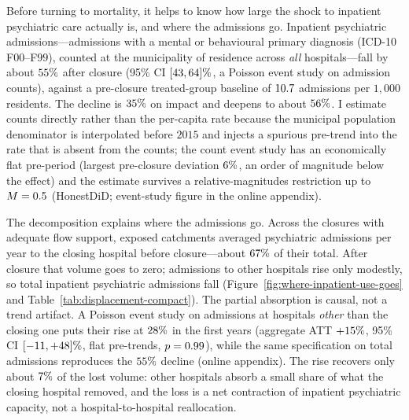 Before turning to mortality, it helps to know how large the shock to inpatient
psychiatric care actually is, and where the admissions go. Inpatient
psychiatric admissions---admissions with a mental or behavioural primary
diagnosis (ICD-10 F$00$--F$99$), counted at the municipality of residence
across \emph{all} hospitals---fall by about $55\%$ after closure
(95\% CI $[43, 64]\%$, a Poisson event study on admission
counts), against a pre-closure treated-group baseline of $10.7$
admissions per $1{,}000$ residents. The decline is $35\%$ on
impact and deepens to about $56\%$. I estimate counts directly
rather than the per-capita rate because the municipal population denominator is
interpolated before $2015$ and injects a spurious pre-trend into the rate that is
absent from the counts; the count event study has an economically flat pre-period
(largest pre-closure deviation $6\%$, an order of magnitude below
the effect) and the estimate survives a relative-magnitudes restriction up to
$M = 0.5$ (HonestDiD; event-study figure in the online appendix).

The decomposition explains where the admissions go.
Across the \valPsychDispNClosures{} closures with adequate flow support, exposed
catchments averaged \valPsychClosingPre{} psychiatric admissions per year to the
closing hospital before closure---about $67\%$ of their total.
After closure that volume goes to zero; admissions to other hospitals rise only
modestly, so total inpatient psychiatric admissions fall
(Figure~\ref{fig:where-inpatient-use-goes} and
Table~\ref{tab:displacement-compact}). The partial absorption is causal, not a
trend artifact. A Poisson event study on admissions at hospitals \emph{other}
than the closing one puts their rise at $28\%$ in the first years
(aggregate ATT $+15\%$, 95\% CI
$[-11, +48]\%$, flat pre-trends, $p = 0.99$),
while the same specification on total admissions reproduces the
$55\%$ decline (online appendix). The rise recovers only about
$7\%$ of the lost volume: other hospitals absorb a small share of
what the closing hospital removed, and the loss is a net contraction of
inpatient psychiatric capacity, not a hospital-to-hospital reallocation.

